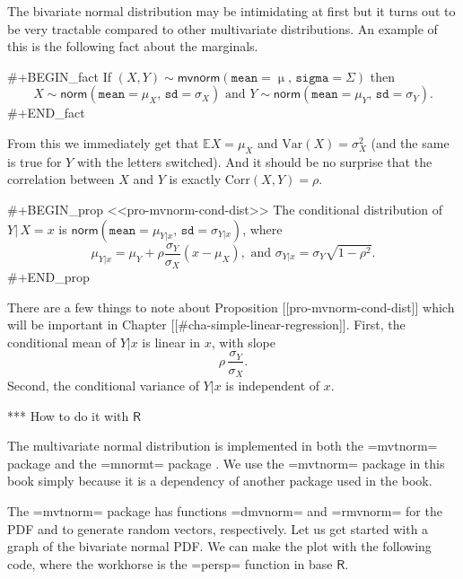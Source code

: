 The bivariate normal distribution may be intimidating at first but it
turns out to be very tractable compared to other multivariate
distributions. An example of this is the following fact about the
marginals.

#+BEGIN_fact
If \((X,Y)\sim\mathsf{mvnorm}(\mathtt{mean}=\upmu,\,\mathtt{sigma}=\Sigma)\) then
\begin{equation}
X\sim\mathsf{norm}(\mathtt{mean}=\mu_{X},\,\mathtt{sd}=\sigma_{X})\mbox{ and }Y\sim\mathsf{norm}(\mathtt{mean}=\mu_{Y},\,\mathtt{sd}=\sigma_{Y}).
\end{equation}
#+END_fact

From this we immediately get that \(\mathbb{E} X=\mu_{X}\) and
\(\mbox{Var}(X)=\sigma_{X}^{2}\) (and the same is true for \(Y\) with
the letters switched). And it should be no surprise that the
correlation between \(X\) and \(Y\) is exactly
\(\mbox{Corr}(X,Y)=\rho\).

#+BEGIN_prop
<<pro-mvnorm-cond-dist>> The conditional distribution of \(Y|\, X=x\)
is \(\mathsf{norm}(\mathtt{mean} = \mu_{Y|x}, \, \mathtt{sd} =
\sigma_{Y|x})\), where
\begin{equation}
\mu_{Y|x}=\mu_{Y}+\rho\frac{\sigma_{Y}}{\sigma_{X}}\left(x-\mu_{X}\right),\mbox{ and }\sigma_{Y|x}=\sigma_{Y}\sqrt{1-\rho^{2}}.
\end{equation}
#+END_prop

There are a few things to note about Proposition [[pro-mvnorm-cond-dist]]
which will be important in Chapter [[#cha-simple-linear-regression]]. First,
the conditional mean of \(Y|x\) is linear in \(x\), with slope
\begin{equation}
\label{eq-population-slope-slr}
\rho\,\frac{\sigma_{Y}}{\sigma_{X}}.
\end{equation}
Second, the conditional variance of \(Y|x\) is independent of \(x\). 

*** How to do it with \(\mathsf{R}\)

The multivariate normal distribution is implemented in both the
=mvtnorm= package \cite{mvtnorm:1} and the =mnormt= package
\cite{mnormt}. We use the =mvtnorm= package in this book simply
because it is a dependency of another package used in the book.

The =mvtnorm= package has functions =dmvnorm= and =rmvnorm= for the
PDF and to generate random vectors, respectively. Let us get started
with a graph of the bivariate normal PDF. We can make the plot with
the following code, where the workhorse is the =persp= function in
base \(\mathsf{R}\).

